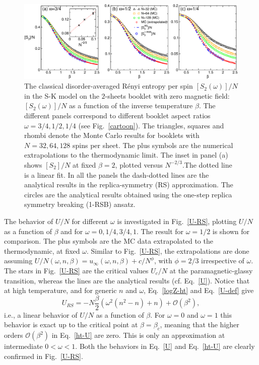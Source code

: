 \documentclass[twocolumn,superscriptaddress,prb,10pt]{revtex4-1}
\begin{document}
\begin{figure}[t]
\includegraphics*[width=0.93\linewidth]{./draft_figs/Renyi_MC_v2}
\caption{ The classical disorder-averaged R\'enyi entropy per spin $[S_2(\omega)]/N$  
 in the S-K model on the $2$-sheets booklet with zero magnetic field: 
 $[S_2(\omega)]/N$ as a function of the inverse temperature $\beta$. The different panels 
 correspond to different booklet aspect ratios $\omega=3/4,1/2,1/4$ (see Fig.~\ref{cartoon}). 
 The triangles, squares and rhombi denote the Monte Carlo results for 
 booklets with $N=32,64,128$ spins per sheet. The plus symbols are the numerical 
 extrapolations to the thermodynamic limit. The inset in panel (a) shows 
 $[S_2]/N$ at fixed $\beta=2$, plotted versus $N^{-2/3}$.The dotted line is 
 a linear fit. In all the panels  the dash-dotted lines are the  
 analytical results in the replica-symmetry (RS) approximation. 
 The circles are the analytical results obtained 
 using the one-step replica symmetry breaking (1-RSB) ansatz.
}
\label{Renyi-MC}
\end{figure}

The behavior of $U/N$ for different $\omega$ is investigated in Fig.~\ref{U-RS},
plotting $U/N$ as a function of $\beta$ and for $\omega=0,1/4,3/4,1$. The result for $\omega=1/2$ 
is shown for comparison. The plus symbols 
are the MC data extrapolated to the thermodynamic, at fixed $\omega$. Similar to Fig.~\ref{U-RS}, 
the extrapolations are done assuming $U/N(\omega,n,\beta)=u_{\infty}(\omega,n,\beta)+
c/N^{\phi}$, with $\phi=2/3$ irrespective of $\omega$. The stars in Fig.~\ref{U-RS} are 
the critical values $U_c/N$ at the paramagnetic-glassy transition, whereas the lines 
are the analytical results (cf. Eq.~\eqref{U}). Notice that at high temperature, and for 
generic $n$ and $\omega$, Eq.~\eqref{logZ-ht} and Eq.~\eqref{U-def} give  
%
\begin{equation}
U_{RS}= -N\frac{\beta}{2}(\omega^2(n^2-n)+n)+{\mathcal O}(\beta^2), 
\label{ht-U}
\end{equation}
%
i.e., a linear behavior of $U/N$ as a function of $\beta$. For $\omega=0$ and $\omega=1$ 
this behavior is exact up to the critical point at $\beta=\beta_c$, meaning that the higher 
orders ${\mathcal O}(\beta^2)$ in Eq.~\eqref{ht-U} are zero. This is only an approximation 
at intermediate $0<\omega<1$. Both the behaviors in Eq.~\eqref{U} and Eq.~\eqref{ht-U} are 
clearly confirmed in Fig.~\ref{U-RS}. 
\end{document}
